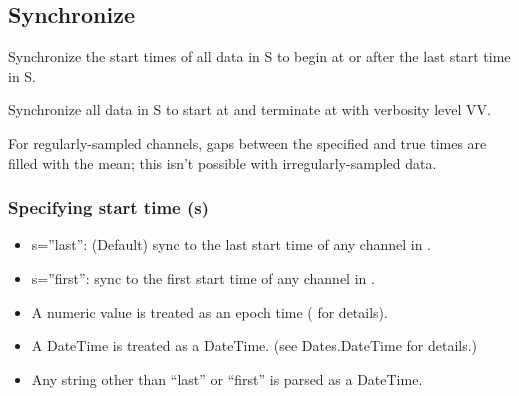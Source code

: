 \documentclass[letterpaper,11pt,english]{sphinxmanual}
\begin{document}
\subsection{Synchronize}
\label{\detokenize{src/Processing/processing:synchronize}}

\begin{fulllineitems}
\end{fulllineitems}


Synchronize the start times of all data in S to begin at or after the last
start time in S.


\begin{fulllineitems}
\end{fulllineitems}


Synchronize all data in S to start at  and terminate at  with verbosity level VV.

For regularly-sampled channels, gaps between the specified and true times
are filled with the mean; this isn’t possible with irregularly-sampled data.


\subsubsection{Specifying start time (s)}
\label{\detokenize{src/Processing/processing:specifying-start-time-s}}\begin{itemize}
\item {} 
s=”last”: (Default) sync to the last start time of any channel in .

\item {} 
s=”first”: sync to the first start time of any channel in .

\item {} 
A numeric value is treated as an epoch time ( for details).

\item {} 
A DateTime is treated as a DateTime. (see Dates.DateTime for details.)

\item {} 
Any string other than “last” or “first” is parsed as a DateTime.

\end{itemize}
\end{document}
